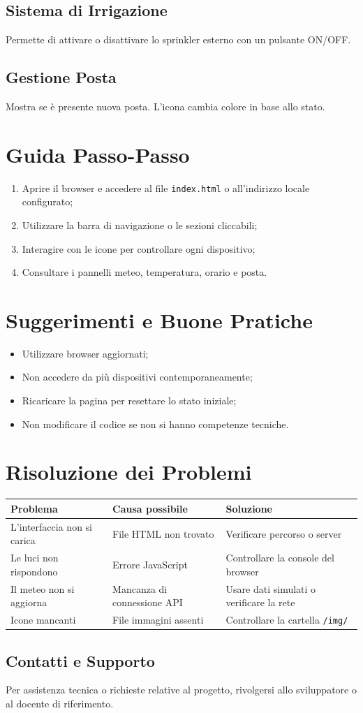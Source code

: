 \documentclass[a4paper,12pt]{article}
\begin{document}
\subsection*{Sistema di Irrigazione}
Permette di attivare o disattivare lo sprinkler esterno con un pulsante ON/OFF.

\subsection*{Gestione Posta}
Mostra se è presente nuova posta. L’icona cambia colore in base allo stato.

\section{Guida Passo-Passo}

\begin{enumerate}
  \item Aprire il browser e accedere al file \texttt{index.html} o all’indirizzo locale configurato;
  \item Utilizzare la barra di navigazione o le sezioni cliccabili;
  \item Interagire con le icone per controllare ogni dispositivo;
  \item Consultare i pannelli meteo, temperatura, orario e posta.
\end{enumerate}

\section{Suggerimenti e Buone Pratiche}

\begin{itemize}[noitemsep]
  \item Utilizzare browser aggiornati;
  \item Non accedere da più dispositivi contemporaneamente;
  \item Ricaricare la pagina per resettare lo stato iniziale;
  \item Non modificare il codice se non si hanno competenze tecniche.
\end{itemize}

\section{Risoluzione dei Problemi}

\begin{tabular}{|p{5cm}|p{5cm}|p{5cm}|}
\hline
\textbf{Problema} & \textbf{Causa possibile} & \textbf{Soluzione} \\
\hline
L’interfaccia non si carica & File HTML non trovato & Verificare percorso o server \\
\hline
Le luci non rispondono & Errore JavaScript & Controllare la console del browser \\
\hline
Il meteo non si aggiorna & Mancanza di connessione API & Usare dati simulati o verificare la rete \\
\hline
Icone mancanti & File immagini assenti & Controllare la cartella \texttt{/img/} \\
\hline
\end{tabular}

\subsection{Contatti e Supporto}

Per assistenza tecnica o richieste relative al progetto, rivolgersi allo sviluppatore o al docente di riferimento.
\end{document}
